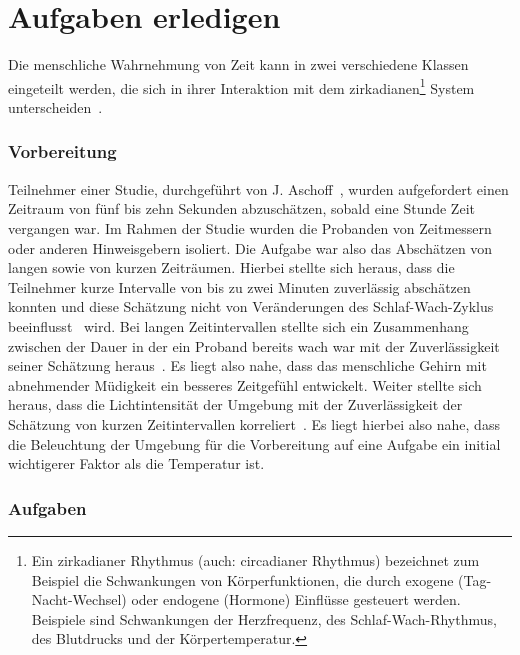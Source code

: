 \section{Aufgaben erledigen}\label{sec:relatedWork.aufgaben}

Die menschliche Wahrnehmung von Zeit kann in zwei verschiedene Klassen eingeteilt werden, die sich in ihrer Interaktion mit dem zirkadianen\footnote{Ein zirkadianer Rhythmus (auch: circadianer Rhythmus) bezeichnet zum Beispiel die Schwankungen von Körperfunktionen, die durch exogene (Tag-Nacht-Wechsel) oder endogene (Hormone) Einflüsse gesteuert werden. Beispiele sind Schwankungen der Herzfrequenz, des Schlaf-Wach-Rhythmus, des Blutdrucks und der Körpertemperatur.} System unterscheiden~\cite{aschoff1998human, aschoff1985perception}.

\subsubsection{Vorbereitung}

Teilnehmer einer Studie, durchgeführt von J. Aschoff~\cite{aschoff1998human}, wurden aufgefordert einen Zeitraum von fünf bis zehn Sekunden abzuschätzen, sobald eine Stunde Zeit vergangen war. Im Rahmen der Studie wurden die Probanden von Zeitmessern oder anderen Hinweisgebern isoliert.
Die Aufgabe war also das Abschätzen von langen sowie von kurzen Zeiträumen. 
Hierbei stellte sich heraus, dass die Teilnehmer kurze Intervalle von bis zu zwei Minuten zuverlässig abschätzen konnten und diese Schätzung nicht von Veränderungen des Schlaf-Wach-Zyklus beeinflusst~\cite{aschoff1998human} wird. 
Bei langen Zeitintervallen stellte sich ein Zusammenhang zwischen der Dauer in der ein Proband bereits wach war mit der Zuverlässigkeit seiner Schätzung heraus~\cite{aschoff1998human}. 
Es liegt also nahe, dass das menschliche Gehirn mit abnehmender Müdigkeit ein besseres Zeitgefühl entwickelt.
Weiter stellte sich heraus, dass die Lichtintensität der Umgebung mit der Zuverlässigkeit der Schätzung von kurzen Zeitintervallen korreliert~\cite{aschoff1998human}.
Es liegt hierbei also nahe, dass die Beleuchtung der Umgebung für die Vorbereitung auf eine Aufgabe ein initial wichtigerer Faktor als die Temperatur ist. 

\subsubsection{Aufgaben}

